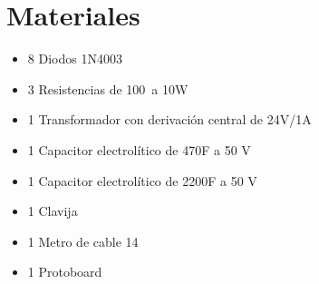 \documentclass[12pt]{article}
\begin{document}
        \section*{Materiales}
        \label{sec:materiales}
        \begin{itemize}
            \item [] 8 \qquad Diodos 1N4003
            \item [] 3 \qquad Resistencias de 100\textOmega\ a 10W
            \item [] 1 \qquad Transformador con derivación central de 24V/1A
            \item [] 1 \qquad Capacitor electrolítico de 470\textmu F a 50 V
            \item [] 1 \qquad Capacitor electrolítico de 2200\textmu F a 50 V
            \item [] 1 \qquad Clavija
            \item [] 1 \qquad Metro de cable 14
            \item [] 1 \qquad Protoboard
        \end{itemize}
        
        
\end{document}
